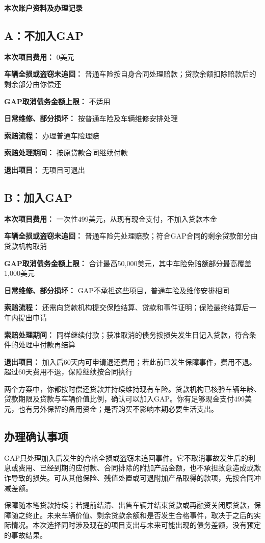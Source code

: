 \documentclass[UTF8,fontset=none,11pt,a4paper]{ctexart}
\begin{document}
{\noindent\fontsize{20}{25}\selectfont\bfseries 本次账户资料及办理记录\par}
\vspace{10pt}
\subsection*{A：不加入GAP}
\textbf{本次项目费用：} 0美元


\textbf{车辆全损或盗窃未追回：} 普通车险按自身合同处理赔款；贷款余额扣除赔款后的剩余部分由你偿还


\textbf{GAP取消债务金额上限：} 不适用


\textbf{日常维修、部分损坏：} 按普通车险及车辆维修安排处理


\textbf{索赔流程：} 办理普通车险理赔


\textbf{索赔处理期间：} 按原贷款合同继续付款


\textbf{退出项目：} 无项目可退出


\subsection*{B：加入GAP}
\textbf{本次项目费用：} 一次性499美元，从现有现金支付，不加入贷款本金


\textbf{车辆全损或盗窃未追回：} 普通车险先处理赔款；符合GAP合同的剩余贷款部分由贷款机构取消


\textbf{GAP取消债务金额上限：} 合计最高50,000美元，其中车险免赔额部分最高覆盖1,000美元


\textbf{日常维修、部分损坏：} GAP不承担这些项目，普通车险及维修安排相同


\textbf{索赔流程：} 还需向贷款机构提交保险结算、贷款和事件证明；保险最终结算后一年内提出申请


\textbf{索赔处理期间：} 同样继续付款；获准取消的债务按损失发生日记入贷款，符合条件的处理中付款再结算


\textbf{退出项目：} 加入后60天内可申请退还费用；若此前已发生保障事件，费用不退。超过60天费用不退，保障继续按合同执行


两个方案中，你都按时偿还贷款并持续维持现有车险。贷款机构已核验车辆年龄、贷款期限及贷款与车辆价值比例，确认可以加入GAP。你有足够现金支付499美元，也有另外保留的备用资金；是否购买不影响本期必要生活支出。


\subsection*{办理确认事项}
GAP只处理加入后发生的合格全损或盗窃未追回事件。它不取消事故发生后的利息或费用、已经到期的应付款、合同排除的附加产品金额，也不承担故意造成或欺诈导致的损失。可从其他保险、残值处置或可退附加产品取得的款项，先按合同冲减差额。


保障随本笔贷款持续；若提前结清、出售车辆并结束贷款或再融资关闭原贷款，保障随之终止。未来车辆价值、剩余贷款余额和是否发生合格事件，取决于之后的实际情况。本次选择同时涉及现在的项目支出与未来可能出现的债务差额，没有预定的事故结果。
\end{document}
